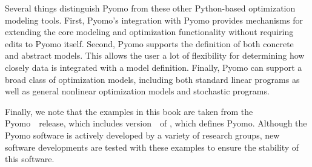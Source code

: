 Several things distinguish Pyomo from these other Python-based
optimization modeling tools.  First, Pyomo's integration with Pyomo
provides mechanisms for extending the core modeling and optimization
functionality without requiring edits to Pyomo itself.  Second,
Pyomo supports the definition of both concrete and abstract models.
This allows the user a lot of flexibility for determining how closely
data is integrated with a model definition.  Finally, Pyomo can support
a broad class of optimization models, including both standard linear
programs as well as general nonlinear optimization models and stochastic programs.

Finally, we note that the examples in this book are taken from the
Pyomo~\PyomoVersion\ release, which includes version~\PyomoVersion\ of
, which defines Pyomo.  Although the Pyomo software
is actively developed by a variety of research groups, new software
developments are tested with these examples to ensure the stability of
this software.

